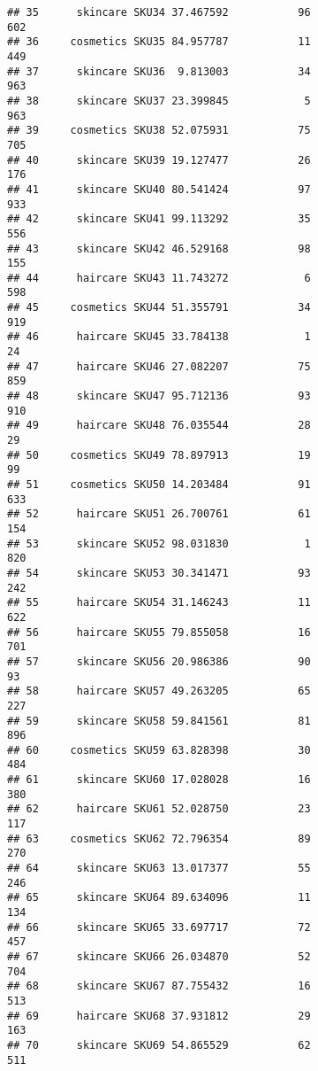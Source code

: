 \documentclass[
]{article}
\begin{document}
\begin{verbatim}
## 35      skincare SKU34 37.467592           96                     602
## 36     cosmetics SKU35 84.957787           11                     449
## 37      skincare SKU36  9.813003           34                     963
## 38      skincare SKU37 23.399845            5                     963
## 39     cosmetics SKU38 52.075931           75                     705
## 40      skincare SKU39 19.127477           26                     176
## 41      skincare SKU40 80.541424           97                     933
## 42      skincare SKU41 99.113292           35                     556
## 43      skincare SKU42 46.529168           98                     155
## 44      haircare SKU43 11.743272            6                     598
## 45     cosmetics SKU44 51.355791           34                     919
## 46      haircare SKU45 33.784138            1                      24
## 47      haircare SKU46 27.082207           75                     859
## 48      skincare SKU47 95.712136           93                     910
## 49      haircare SKU48 76.035544           28                      29
## 50     cosmetics SKU49 78.897913           19                      99
## 51     cosmetics SKU50 14.203484           91                     633
## 52      haircare SKU51 26.700761           61                     154
## 53      skincare SKU52 98.031830            1                     820
## 54      skincare SKU53 30.341471           93                     242
## 55      haircare SKU54 31.146243           11                     622
## 56      haircare SKU55 79.855058           16                     701
## 57      skincare SKU56 20.986386           90                      93
## 58      haircare SKU57 49.263205           65                     227
## 59      skincare SKU58 59.841561           81                     896
## 60     cosmetics SKU59 63.828398           30                     484
## 61      skincare SKU60 17.028028           16                     380
## 62      haircare SKU61 52.028750           23                     117
## 63     cosmetics SKU62 72.796354           89                     270
## 64      skincare SKU63 13.017377           55                     246
## 65      skincare SKU64 89.634096           11                     134
## 66      skincare SKU65 33.697717           72                     457
## 67      skincare SKU66 26.034870           52                     704
## 68      skincare SKU67 87.755432           16                     513
## 69      haircare SKU68 37.931812           29                     163
## 70      skincare SKU69 54.865529           62                     511

\end{verbatim}
\end{document}
